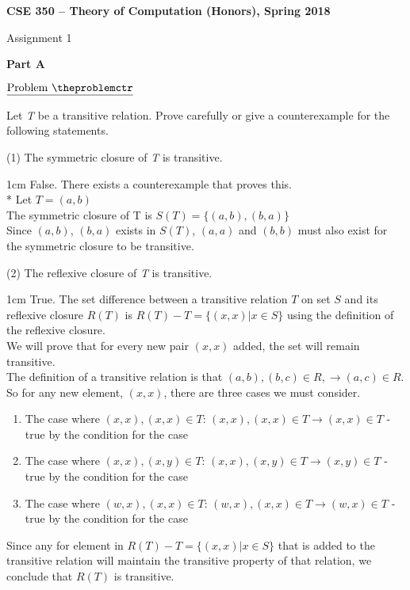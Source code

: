 \documentclass[11pt]{article}
\newenvironment{mathline}{\begin{adjustwidth}{1cm}{}}{\end{adjustwidth}}
\def\pp{\par\noindent}
\begin{document}
\centerline{\bf CSE 350 -- Theory of Computation (Honors), Spring 2018}
\medskip
\centerline{Assignment 1}
\bigskip
\bigskip
{}

\centerline{\bf Part A}



\addtocounter{problemctr}{1}
\bigskip
\noindent
$\underline{\rm Problem\ \theproblemctr}$\pp Let {\em T} be a transitive
relation. Prove carefully or give a counterexample for the following
statements.

\noindent
(1) The symmetric closure of {\em T} is transitive.\\
\begin{mathline}
False. There exists a counterexample that proves this.\\*
Let $T={(a,b)}$\\
The symmetric closure of T is $S(T)=\{(a,b),(b,a)\}$\\
Since $(a,b)$, $(b,a)$ exists in $S(T)$, $(a,a)$ and $(b,b)$ must also exist for the symmetric closure to be transitive.\\
\end{mathline}

\noindent
(2) The reflexive closure of {\em T} is transitive.\\
\begin{mathline}
True. The set difference between a transitive relation $T$ on set $S$ and its reflexive closure $R(T)$ is $R(T)-T=\{(x,x)|x\in S\}$ using the definition of the reflexive closure.\\
We will prove that for every new pair $(x,x)$ added, the set will remain transitive.\\
The definition of a transitive relation is that $(a,b),(b,c)\in R,\rightarrow (a,c)\in R$. So for any new element, $(x,x)$, there are three cases we must consider.
\begin{enumerate}
    \item The case where $(x,x),(x,x)\in T$: $(x,x),(x,x)\in T\rightarrow (x,x) \in T$ - true by the condition for the case
    \item The case where $(x,x),(x,y)\in T$: $(x,x),(x,y)\in T\rightarrow (x,y) \in T$ - true by the condition for the case
    \item The case where $(w,x),(x,x)\in T$: $(w,x),(x,x)\in T\rightarrow (w,x) \in T$ - true by the condition for the case
\end{enumerate}
Since any for element in $R(T)-T=\{(x,x)|x\in S\}$ that is added to the transitive relation will maintain the transitive property of that relation, we conclude that $R(T)$ is transitive.
\end{mathline}
\end{document}

